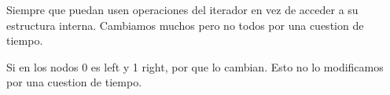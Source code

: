 
\begin{DoxyRefList}
\item[\label{bug__bug000001}%
\hypertarget{bug__bug000001}{}%
Miembro \hyperlink{classaed2_1_1map_a0b0a11f906da2926f9eb342fcee79fd7_a0b0a11f906da2926f9eb342fcee79fd7}{aed2\+:\+:map$<$ Key, Meaning, Compare $>$\+:\+:at} (const Key \&key) const ]Siempre que puedan usen operaciones del iterador en vez de acceder a su estructura interna. Cambiamos muchos pero no todos por una cuestion de tiempo. 
\item[\label{bug__bug000002}%
\hypertarget{bug__bug000002}{}%
Miembro \hyperlink{classaed2_1_1map_a54b1ea9f8c707232c744a4ac5c5302d2_a54b1ea9f8c707232c744a4ac5c5302d2}{aed2\+:\+:map$<$ Key, Meaning, Compare $>$\+:\+:Rotate} (\hyperlink{structaed2_1_1map_1_1Node}{Node} $\ast$n, int i)]Si en los nodos 0 es left y 1 right, por que lo cambian. Esto no lo modificamos por una cuestion de tiempo.
\end{DoxyRefList}